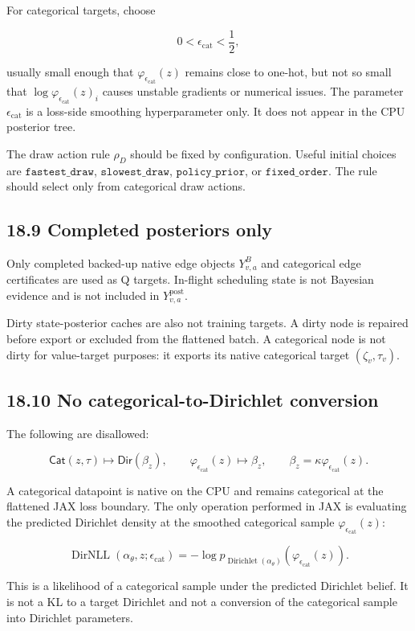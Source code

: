 \documentclass[11pt]{article}
\newcommand{\Dir}{\operatorname{Dirichlet}}
\newcommand{\epscat}{\epsilon_{\mathrm{cat}}}
\newcommand{\CatPoint}{\varphi_{\epsilon_{\mathrm{cat}}}}
\newcommand{\DirNLL}{\operatorname{DirNLL}}
\newcommand{\DirObj}{\mathsf{Dir}}
\newcommand{\CatObj}{\mathsf{Cat}}
\begin{document}
For categorical targets, choose

\[
0<\epscat<\frac12,
\]

usually small enough that \(\CatPoint(z)\) remains close to one-hot, but not so
small that \(\log\CatPoint(z)_i\) causes unstable gradients or numerical issues.
The parameter \(\epscat\) is a loss-side smoothing hyperparameter only. It does
not appear in the CPU posterior tree.

The draw action rule \(\rho_D\) should be fixed by configuration. Useful initial
choices are \(\texttt{fastest\_draw}\), \(\texttt{slowest\_draw}\),
\(\texttt{policy\_prior}\), or \(\texttt{fixed\_order}\). The rule should select
only from categorical draw actions.

\subsection*{18.9 Completed posteriors only}

Only completed backed-up native edge objects \(Y^B_{v,a}\) and categorical edge
certificates are used as Q targets. In-flight scheduling state is not Bayesian
evidence and is not included in \(Y^{\mathrm{post}}_{v,a}\).

Dirty state-posterior caches are also not training targets. A dirty node is
repaired before export or excluded from the flattened batch. A categorical node
is not dirty for value-target purposes: it exports its native categorical target
\((\zeta_v,\tau_v)\).

\subsection*{18.10 No categorical-to-Dirichlet conversion}

The following are disallowed:

\[
\CatObj(z,\tau)\mapsto \DirObj(\beta_z),
\qquad
\CatPoint(z)\mapsto \beta_z,
\qquad
\beta_z=\kappa\CatPoint(z).
\]

A categorical datapoint is native on the CPU and remains categorical at the
flattened JAX loss boundary. The only operation performed in JAX is evaluating
the predicted Dirichlet density at the smoothed categorical sample
\(\CatPoint(z)\):

\[
\DirNLL(\alpha_\theta,z;\epscat)
=
-\log p_{\Dir(\alpha_\theta)}(\CatPoint(z)).
\]

This is a likelihood of a categorical sample under the predicted Dirichlet
belief. It is not a KL to a target Dirichlet and not a conversion of the
categorical sample into Dirichlet parameters.
\end{document}

